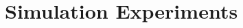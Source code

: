 \chapter{Simulation Experiments}





\clearpage




\clearpage




\clearpage




\clearpage




\clearpage




\clearpage


